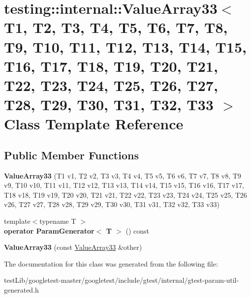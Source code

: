 \hypertarget{classtesting_1_1internal_1_1ValueArray33}{}\section{testing\+:\+:internal\+:\+:Value\+Array33$<$ T1, T2, T3, T4, T5, T6, T7, T8, T9, T10, T11, T12, T13, T14, T15, T16, T17, T18, T19, T20, T21, T22, T23, T24, T25, T26, T27, T28, T29, T30, T31, T32, T33 $>$ Class Template Reference}
\label{classtesting_1_1internal_1_1ValueArray33}
\subsection*{Public Member Functions}
\begin{DoxyCompactItemize}
\item 
\mbox{\label{classtesting_1_1internal_1_1ValueArray33_a651446935b07a1e9186f053da55d9a43}} 
{\bfseries Value\+Array33} (T1 v1, T2 v2, T3 v3, T4 v4, T5 v5, T6 v6, T7 v7, T8 v8, T9 v9, T10 v10, T11 v11, T12 v12, T13 v13, T14 v14, T15 v15, T16 v16, T17 v17, T18 v18, T19 v19, T20 v20, T21 v21, T22 v22, T23 v23, T24 v24, T25 v25, T26 v26, T27 v27, T28 v28, T29 v29, T30 v30, T31 v31, T32 v32, T33 v33)
\item 
\mbox{\label{classtesting_1_1internal_1_1ValueArray33_adba3f5fe897de2c06eb6b5aa9965c7c0}} 
{\footnotesize template$<$typename T $>$ }\\{\bfseries operator Param\+Generator$<$ T $>$} () const
\item 
\mbox{\label{classtesting_1_1internal_1_1ValueArray33_a27fe430ae99bcd191f6a972ed239a5b0}} 
{\bfseries Value\+Array33} (const \hyperlink{classtesting_1_1internal_1_1ValueArray33}{Value\+Array33} \&other)
\end{DoxyCompactItemize}


The documentation for this class was generated from the following file\+:\begin{DoxyCompactItemize}
\item 
test\+Lib/googletest-\/master/googletest/include/gtest/internal/gtest-\/param-\/util-\/generated.\+h\end{DoxyCompactItemize}
